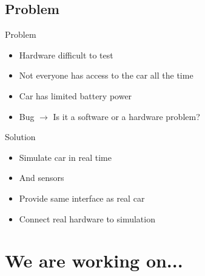 \documentclass[pdf]{beamer}
\begin{document}
\subsection{Problem}
\begin{frame}
\begin{alertblock}{Problem}
\begin{itemize}
  \item Hardware difficult to test
  \item Not everyone has access to the car all the time
  \item Car has limited battery power
  \item Bug $\rightarrow$ Is it a software or a hardware problem?
\end{itemize}
\end{alertblock}
\begin{exampleblock}{Solution}
\begin{itemize}
  \item Simulate car in real time
  \item And sensors
  \item Provide same interface as real car
  \item Connect real hardware to simulation
\end{itemize}
\end{exampleblock}
\end{frame}
\section{We are working on...}
\end{document}
